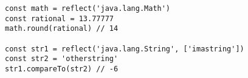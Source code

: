 \vspace{-2.25em}
\begin{center}
\begin{minipage}[t]{1\textwidth}
\begin{listing}[H]
\begin{spacing}{0.6}
\begin{verbatim}
const math = reflect('java.lang.Math')
const rational = 13.77777
math.round(rational) // 14

const str1 = reflect('java.lang.String', ['imastring'])
const str2 = 'otherstring'
str1.compareTo(str2) // -6
\end{verbatim}
\end{spacing}
\end{listing}
\end{minipage}
\end{center}
